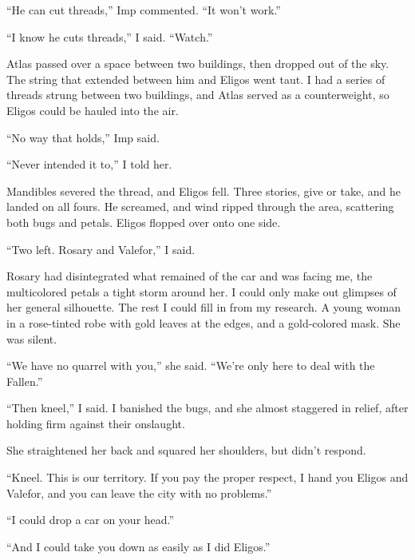 ``He can cut threads,'' Imp commented.  ``It won't work.''



``I know he cuts threads,'' I said.  ``Watch.''



Atlas passed over a space between two buildings, then dropped out of the sky.  The string that extended between him and Eligos went taut.  I had a series of threads strung between two buildings, and Atlas served as a counterweight, so Eligos could be hauled into the air.



``No way that holds,'' Imp said.



``Never intended it to,'' I told her.



Mandibles severed the thread, and Eligos fell.  Three stories, give or take, and he landed on all fours.  He screamed, and wind ripped through the area, scattering both bugs and petals.  Eligos flopped over onto one side.



``Two left.  Rosary and Valefor,'' I said.



Rosary had disintegrated what remained of the car and was facing me, the multicolored petals a tight storm around her.  I could only make out glimpses of her general silhouette.  The rest I could fill in from my research.  A young woman in a rose-tinted robe with gold leaves at the edges, and a gold-colored mask.  She was silent.



``We have no quarrel with you,'' she said.  ``We're only here to deal with the Fallen.''



``Then kneel,'' I said.  I banished the bugs, and she almost staggered in relief, after holding firm against their onslaught.



She straightened her back and squared her shoulders, but didn't respond.



``Kneel.  This is our territory.  If you pay the proper respect, I hand you Eligos and Valefor, and you can leave the city with no problems.''



``I could drop a car on your head.''



``And I could take you down as easily as I did Eligos.''



